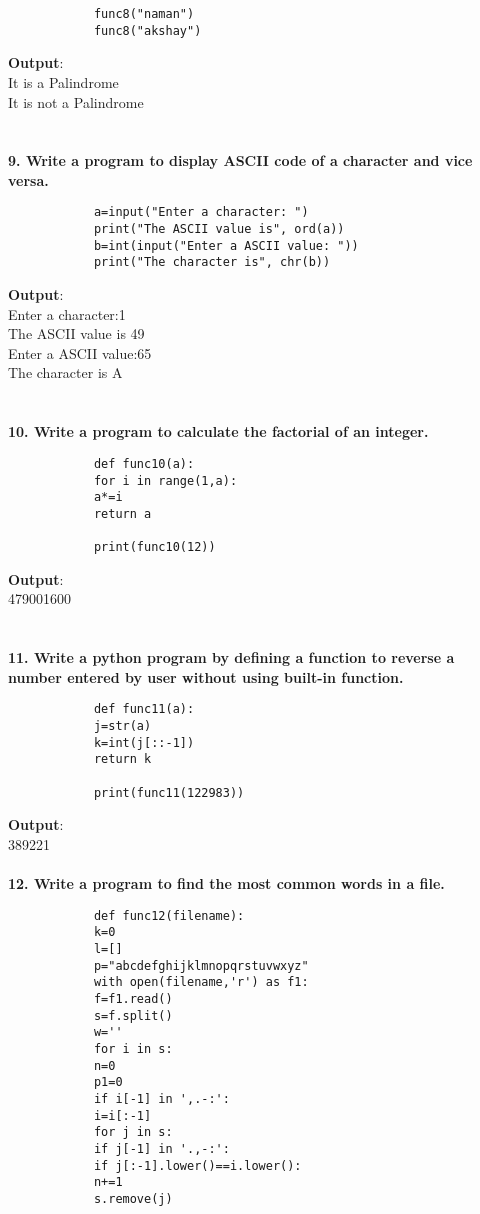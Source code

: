 \documentclass[
a4paper]{article}
\begin{document}
\begin{large}
\begin{verbatim}
			func8("naman")
			func8("akshay")
		\end{verbatim}
		\textbf{Output}:\\
		It is a Palindrome\\
		It is not a Palindrome\\
		\\
		\\\textbf{9. Write a program to display ASCII code of a character and vice versa.}
		\begin{verbatim}
			a=input("Enter a character: ")
			print("The ASCII value is", ord(a)) 
			b=int(input("Enter a ASCII value: "))
			print("The character is", chr(b))
		\end{verbatim}
		\textbf{Output}:\\
		Enter a character:1\\
		The ASCII value is 49\\
		Enter a ASCII value:65\\
		The character is A\\
		\\
		\\\textbf{10. Write a program to calculate the factorial of an integer.}
		\begin{verbatim}
			def func10(a):
			for i in range(1,a):
			a*=i
			return a
			
			print(func10(12))
		\end{verbatim}
		\textbf{Output}:\\
		479001600\\
		\\
		\ \textbf{\\11. Write a python program by defining a function to reverse a number entered by
			user without using built-in function.}
		\begin{verbatim}
			def func11(a):
			j=str(a)
			k=int(j[::-1])
			return k
			
			print(func11(122983))
		\end{verbatim}
		\textbf{Output}:\\
		389221\\
		\\\textbf{12. Write a program to find the most common words in a file.}
		\begin{verbatim}
			def func12(filename):
			k=0
			l=[]
			p="abcdefghijklmnopqrstuvwxyz"
			with open(filename,'r') as f1:
			f=f1.read()
			s=f.split()
			w=''
			for i in s:
			n=0
			p1=0
			if i[-1] in ',.-:':
			i=i[:-1]
			for j in s:
			if j[-1] in '.,-:':
			if j[:-1].lower()==i.lower():
			n+=1
			s.remove(j)
			

\end{verbatim}
\end{large}
\end{document}
